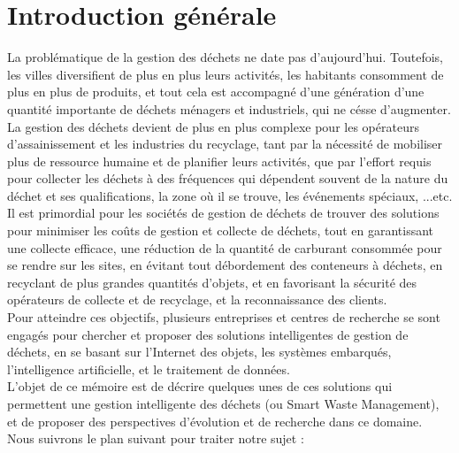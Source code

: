 \documentclass[a4paper,12pt]{report}
\begin{document}
\chapter*{Introduction générale}
La problématique de la gestion des déchets ne date pas d'aujourd'hui. Toutefois, les villes diversifient de plus en plus leurs activités, les habitants consomment de plus en plus de produits, et tout cela est accompagné d'une génération d'une quantité importante de déchets ménagers et industriels, qui ne césse d'augmenter.\\ La gestion des déchets devient de plus en plus complexe pour les opérateurs d'assainissement et les industries du recyclage, tant par la nécessité de mobiliser plus de ressource humaine et de planifier leurs activités, que par l'effort requis pour collecter les déchets à des fréquences qui dépendent souvent de la nature du déchet et ses qualifications, la zone où il se trouve, les événements spéciaux, ...etc.\\
Il est primordial pour les sociétés de gestion de déchets de trouver des solutions pour minimiser les coûts de gestion et collecte de déchets, tout en garantissant une collecte efficace, une réduction de la quantité de carburant consommée pour se rendre sur les sites, en évitant tout débordement des conteneurs à déchets, en recyclant de plus grandes quantités d'objets, et en favorisant la sécurité des opérateurs de collecte et de recyclage, et la reconnaissance des clients.\\ 
Pour atteindre ces objectifs, plusieurs entreprises et centres de recherche se sont engagés pour chercher et proposer des solutions intelligentes de gestion de déchets, en se basant sur l'Internet des objets, les systèmes embarqués, l'intelligence artificielle, et le traitement de données.\\
L'objet de ce mémoire est de décrire quelques unes de ces solutions qui permettent une gestion intelligente des déchets (ou Smart Waste Management), et de proposer des perspectives d'évolution et de recherche dans ce domaine.\\ 
Nous suivrons le plan suivant pour traiter notre sujet :\\
\end{document}
